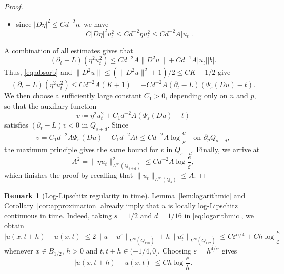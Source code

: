 \documentclass[a4paper,11pt]{amsart}
\theoremstyle{plain}
\theoremstyle{definition}
\newtheorem{remark}[theorem]{Remark}
\numberwithin{equation}{section}
\begin{document}
\begin{proof}
\begin{itemize}
    \item since $|D\eta|^2 \leq Cd^{-2}\eta$, we have
    \begin{equation*}
        C|D\eta|^2u_t^2 \leq Cd^{-2}\eta u_t^2 \leq Cd^{-2}A|u_t|.
    \end{equation*}
\end{itemize}
A combination of all estimates gives that
\begin{equation}\label{eq:product}
 (\partial_t-L)(\eta^2u_t^2)
 \leq Cd^{-2}A\|D^2u\|+Cd^{-1}A|u_t||b|.
\end{equation}
Thus, \eqref{eq:absorb} and $\|D^2u\|\leq (\|D^2u\|^2+1)/2\leq CK+1/2$ give
\begin{equation*}
    (\partial_t-L)(\eta^2u_t^2) \leq Cd^{-2}A(K+1)=-Cd^{-2}A (\partial_t-L)(\Psi_{\varepsilon}(Du)-t).
\end{equation*}
We then choose a sufficiently large constant $C_1>0$, depending only on $n$ and $p$, so that the auxiliary function
\begin{equation*}
     v\coloneqq\eta^2u_t^2 + C_1d^{-2}A(\Psi_\varepsilon(Du)-t)
\end{equation*}
satisfies $(\partial_t-L)v<0$ in $Q_{s+d}$. Since
\begin{equation*}
     v=C_1d^{-2}A\Psi_\varepsilon(Du)-C_1d^{-2}At\leq Cd^{-2}A\log\frac e\varepsilon \quad \text{on $\partial_pQ_{s+d}$},
\end{equation*}
the maximum principle gives the same bound for $v$ in $Q_{s+d}$. Finally, we arrive at
\begin{equation*}
    A^2=\|\eta u_t\|_{L^{\infty}(Q_{s+d})}^2 \leq Cd^{-2}A\log\frac e\varepsilon,
\end{equation*}
which finishes the proof by recalling that $\|u_t\|_{L^{\infty}(Q_s)} \leq A$.
\end{proof}


\begin{remark}[Log-Lipschitz regularity in time]\label{rem:log-lipschitz}
Lemma~\ref{lem:logarithmic} and Corollary~\ref{cor:approximation} already imply that $u$ is locally log-Lipschitz continuous in time. Indeed, taking $s=1/2$ and $d=1/16$ in \eqref{eq:logarithmic}, we obtain
\begin{equation*}
 |u(x,t+h)-u(x,t)|
 \leq 2\|u-u^\varepsilon\|_{L^\infty(Q_{7/8})}
      +h\|u_t^\varepsilon\|_{L^\infty(Q_{1/2})}
 \leq C\varepsilon^{\alpha/4}+Ch\log\frac e\varepsilon
\end{equation*}
whenever $x\in B_{1/2}$, $h>0$ and $t,t+h\in(-1/4,0]$. Choosing $\varepsilon=h^{4/\alpha}$ gives
\begin{equation*}
 |u(x,t+h)-u(x,t)|\leq Ch\log\frac {e}{h}.
\end{equation*}
\end{remark}
\end{document}
